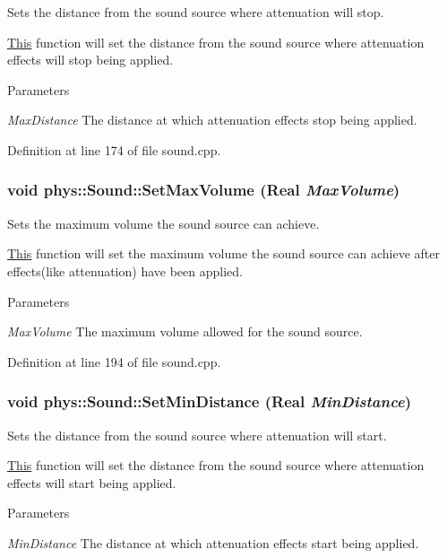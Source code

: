 Sets the distance from the sound source where attenuation will stop. 

\hyperlink{structThis}{This} function will set the distance from the sound source where attenuation effects will stop being applied. 
\begin{DoxyParams}{Parameters}
\item[{\em MaxDistance}]The distance at which attenuation effects stop being applied. \end{DoxyParams}


Definition at line 174 of file sound.cpp.

\hypertarget{classphys_1_1Sound_a04994399e336c8a0726c5da9f6349545}{
\subsubsection[{SetMaxVolume}]{\setlength{\rightskip}{0pt plus 5cm}void phys::Sound::SetMaxVolume ({\bf Real} {\em MaxVolume})}}
\label{dc/d2f/classphys_1_1Sound_a04994399e336c8a0726c5da9f6349545}


Sets the maximum volume the sound source can achieve. 

\hyperlink{structThis}{This} function will set the maximum volume the sound source can achieve after effects(like attenuation) have been applied. 
\begin{DoxyParams}{Parameters}
\item[{\em MaxVolume}]The maximum volume allowed for the sound source. \end{DoxyParams}


Definition at line 194 of file sound.cpp.

\hypertarget{classphys_1_1Sound_ae32d4c4b8a09bfbdcfea68cfa71aa354}{
\subsubsection[{SetMinDistance}]{\setlength{\rightskip}{0pt plus 5cm}void phys::Sound::SetMinDistance ({\bf Real} {\em MinDistance})}}
\label{dc/d2f/classphys_1_1Sound_ae32d4c4b8a09bfbdcfea68cfa71aa354}


Sets the distance from the sound source where attenuation will start. 

\hyperlink{structThis}{This} function will set the distance from the sound source where attenuation effects will start being applied. 
\begin{DoxyParams}{Parameters}
\item[{\em MinDistance}]The distance at which attenuation effects start being applied. \end{DoxyParams}


